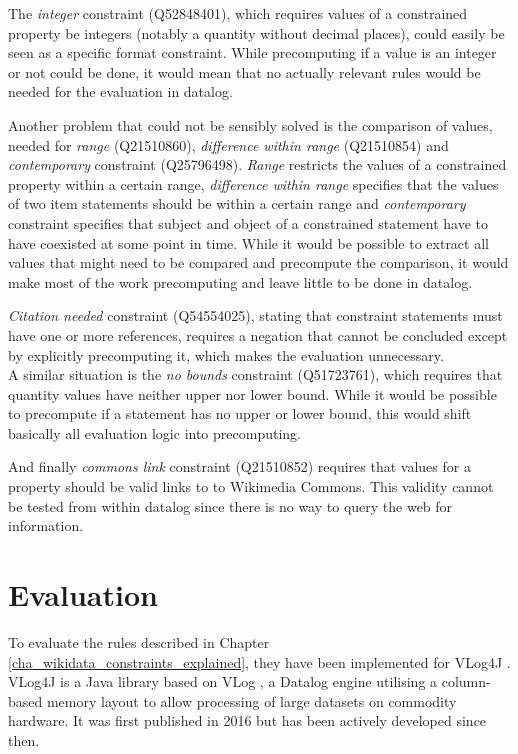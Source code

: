 \documentclass[hyperref,bachelorofscience,fleqn]{cgvpub}
\begin{document}
The \emph{integer} constraint (Q52848401), which requires values of a constrained property be integers (notably a quantity without decimal places), could easily be seen as a specific format constraint. While precomputing if a value is an integer or not could be done, it would mean that no actually relevant rules would be needed for the evaluation in datalog.

Another problem that could not be sensibly solved is the comparison of values, needed for \emph{range} (Q21510860), \emph{difference within range} (Q21510854) and \emph{contemporary} constraint (Q25796498). \emph{Range} restricts the values of a constrained property within a certain range, \emph{difference within range} specifies that the values of two item statements should be within a certain range and \emph{contemporary} constraint specifies that subject and object of a constrained statement have to have coexisted at some point in time. While it would be possible to extract all values that might need to be compared and precompute the comparison, it would make most of the work precomputing and leave little to be done in datalog.

\emph{Citation needed} constraint (Q54554025), stating that constraint statements must have one or more references, requires a negation that cannot be concluded except by explicitly precomputing it, which makes the evaluation unnecessary. \\
A similar situation is the \emph{no bounds} constraint (Q51723761), which requires that quantity values have neither upper nor lower bound. While it would be possible to precompute if a statement has no upper or lower bound, this would shift basically all evaluation logic into precomputing.

And finally \emph{commons link} constraint (Q21510852) requires that values for a property should be valid links to to Wikimedia Commons. This validity cannot be tested from within datalog since there is no way to query the web for information.

\chapter{Evaluation}\label{cha_evaluation}

To evaluate the rules described in Chapter \ref{cha_wikidata_constraints_explained}, they have been implemented for VLog4J \cite{vlog4j}. VLog4J is a Java library based on VLog \cite{vlog}, a Datalog engine utilising a column-based memory layout to allow processing of large datasets on commodity hardware. It was first published in 2016\cite{UJK2016} but has been actively developed since then.
\end{document}

